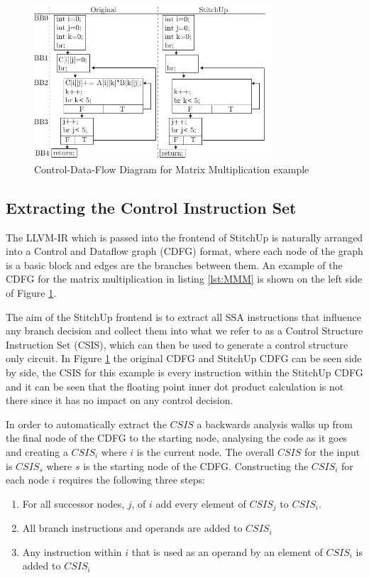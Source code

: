 \begin{figure}[t]
\centering
\includegraphics[width=3.5in]{./imgs/mmm_cdfg.pdf}
\caption{Control-Data-Flow Diagram for Matrix Multiplication example}
\label{fig:mmm_cdfg}
\end{figure}

\subsection{Extracting the Control Instruction Set}
The LLVM-IR which is passed into the frontend of StitchUp is naturally arranged into a Control and Dataflow graph (CDFG) format,
where each node of the graph is a basic block and edges are the branches between them.
An example of the CDFG for the matrix multiplication in listing \ref{lst:MMM}
is shown on the left side of Figure \ref{fig:mmm_cdfg}.

The aim of the StitchUp frontend is to extract all SSA instructions that influence any branch decision and collect them into what
we refer to as a Control Structure Instruction Set (CSIS), which can then be used to generate a control structure only circuit.
In Figure \ref{fig:mmm_cdfg} the original CDFG and StitchUp CDFG can be seen side by side, the CSIS for this example
is every instruction within the StitchUp CDFG and it can be seen that the floating point inner dot product calculation
is not there since it has no impact on any control decision.

In order to automatically extract the $CSIS$ a backwards analysis walks up from the final node of the CDFG to the starting node, analysing
the code as it goes and creating a $CSIS_{i}$ where $i$ is the current node.
The overall $CSIS$ for the input is $CSIS_s$ where $s$ is the starting node of the CDFG.
Constructing the $CSIS_i$ for each node $i$ requires the following three steps:
\begin{enumerate}
    \item For all successor nodes, $j$, of $i$ add every element of $CSIS_j$ to $CSIS_i$.
    \item All branch instructions and operands are added to $CSIS_i$
    \item Any instruction within $i$ that is used as an operand by an element of $CSIS_i$ is added to $CSIS_i$
\end{enumerate}

